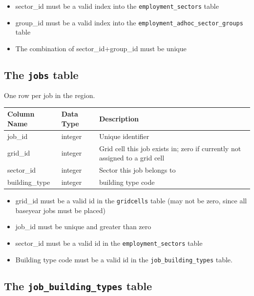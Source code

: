 \begin{itemize} \tight
\item sector_id must be a valid index into the \verb|employment_sectors| table
\item group_id must be a valid index into the \verb|employment_adhoc_sector_groups| table
\item The combination of sector_id+group_id must be unique
\end{itemize}

\subsection{The {\tt jobs} table}

One row per job in the region.

\begin{tabular}{|l|l|l|}
\hline
\textbf{Column Name} & \textbf{Data Type} & \textbf{Description} \\
\hline
job_id & integer & Unique identifier  \\
\hline
grid_id & integer & Grid cell this job exists in; zero if currently not assigned to a grid cell  \\
\hline
sector_id & integer & Sector this job belongs to  \\\hline
building_type & integer & building type code \\
\hline

\end{tabular}

\begin{itemize} \tight
\item grid_id must be a valid id in the \verb|gridcells| table (may not be zero,
since all baseyear jobs must be placed)
\item job_id must be unique and greater than zero
\item sector_id must be a valid id in the \verb|employment_sectors| table
\item Building type code must be a valid id in the \verb|job_building_types| table.
\end{itemize}

\subsection{The {\tt job_building_types} table}

